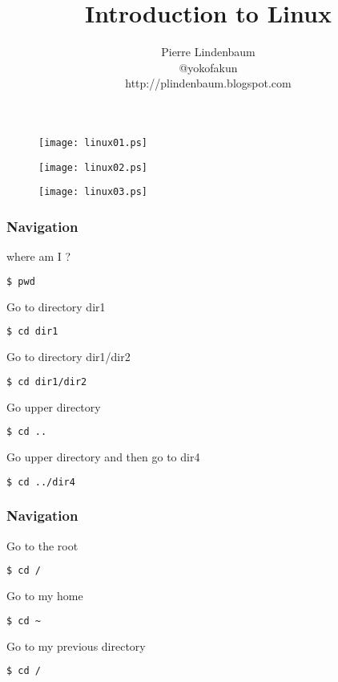 \documentclass{beamer}
\title{Introduction to Linux}
\author{Pierre Lindenbaum\\@yokofakun\\http://plindenbaum.blogspot.com}\institute{Institut du Thorax. Nantes. France}
\begin{document}
\begin{frame}
\titlepage
\end{frame}



\begin{frame}
\begin{figure}
\texttt{[image: linux01.ps]}
\end{figure}
\end{frame}

\begin{frame}
\begin{figure}
\texttt{[image: linux02.ps]}
\end{figure}
\end{frame}

\begin{frame}
\begin{figure}
\texttt{[image: linux03.ps]}
\end{figure}
\end{frame}


\begin{frame}[fragile]
\frametitle{Navigation}

where am I ?
\begin{lstlisting}[language=bash]
$ pwd
\end{lstlisting}

Go to directory dir1
\begin{lstlisting}[language=bash]
$ cd dir1
\end{lstlisting}

Go to directory dir1/dir2
\begin{lstlisting}[language=bash]
$ cd dir1/dir2
\end{lstlisting}


Go upper directory
\begin{lstlisting}[language=bash]
$ cd ..
\end{lstlisting}

Go upper directory and then go to dir4
\begin{lstlisting}[language=bash]
$ cd ../dir4
\end{lstlisting}


\end{frame}

\begin{frame}[fragile]
\frametitle{Navigation}

Go to the root
\begin{lstlisting}[language=bash]
$ cd /
\end{lstlisting}

Go to my home
\begin{lstlisting}[language=bash]
$ cd ~
\end{lstlisting}

Go to my previous directory
\begin{lstlisting}[language=bash]
$ cd /
\end{lstlisting}

\end{frame}
\end{document}
